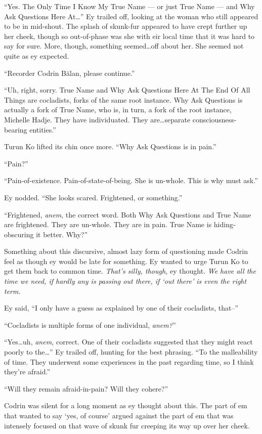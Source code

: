 ``Yes. The Only Time I Know My True Name — or just True Name — and Why Ask Questions Here At\ldots{}'' Ey trailed off, looking at the woman who still appeared to be in mid-shout. The splash of skunk-fur appeared to have crept further up her cheek, though so out-of-phase was she with eir local time that it was hard to say for sure. More, though, something seemed\ldots off about her. She seemed not quite as ey expected.

``Recorder Codrin Bălan, please continue.''

``Uh, right, sorry. True Name and Why Ask Questions Here At The End Of All Things are cocladists, forks of the same root instance. Why Ask Questions is actually a fork of True Name, who is, in turn, a fork of the root instance, Michelle Hadje. They have individuated. They are\ldots separate consciousness-bearing entities.''

Turun Ko lifted its chin once more. ``Why Ask Questions is in pain.''

``Pain?''

``Pain-of-existence. Pain-of-state-of-being. She is un-whole. This is why must ask.''

Ey nodded. ``She looks scared. Frightened, or something.''

``Frightened, \emph{anem}, the correct word. Both Why Ask Questions and True Name are frightened. They are un-whole. They are in pain. True Name is hiding-obscuring it better. Why?''

Something about this discursive, almost lazy form of questioning made Codrin feel as though ey would be late for something. Ey wanted to urge Turun Ko to get them back to common time. \emph{That's silly, though,} ey thought. \emph{We have all the time we need, if hardly any is passing out there, if `out there' is even the right term.}

Ey said, ``I only have a guess as explained by one of their cocladists, that--''

``Cocladists is multiple forms of one individual, \emph{anem?}''

``Yes\ldots uh, \emph{anem,} correct. One of their cocladists suggested that they might react poorly to the\ldots{}'' Ey trailed off, hunting for the best phrasing. ``To the malleability of time. They underwent some experiences in the past regarding time, so I think they're afraid.''

``Will they remain afraid-in-pain? Will they cohere?''

Codrin was silent for a long moment as ey thought about this. The part of em that wanted to say `yes, of course' argued against the part of em that was intensely focused on that wave of skunk fur creeping its way up over her cheek.

